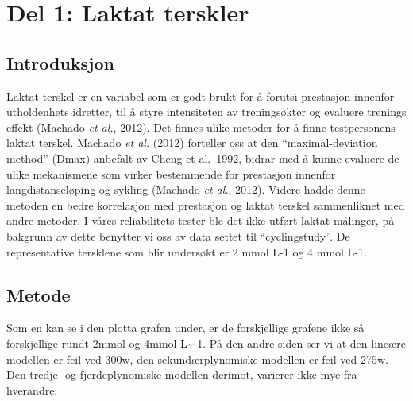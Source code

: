 \documentclass[
  letterpaper,
  DIV=11,
  numbers=noendperiod]{scrreprt}
\begin{document}
\section{Del 1: Laktat terskler}\label{del-1-laktat-terskler}

\subsection{Introduksjon}\label{introduksjon-1}

Laktat terskel er en variabel som er godt brukt for å forutsi prestasjon
innenfor utholdenhets idretter, til å styre intensiteten av
treningsøkter og evaluere trenings effekt (Machado \emph{et al.}, 2012).
Det finnes ulike metoder for å finne testpersonens laktat terskel.
Machado \emph{et al.} (2012) forteller oss at den ``maximal-deviation
method'' (Dmax) anbefalt av Cheng et al.~1992, bidrar med å kunne
evaluere de ulike mekanismene som virker bestemmende for prestasjon
innenfor langdistanseløping og sykling (Machado \emph{et al.}, 2012).
Videre hadde denne metoden en bedre korrelasjon med prestasjon og laktat
terskel sammenliknet med andre metoder. I våres reliabilitets tester ble
det ikke utført laktat målinger, på bakgrunn av dette benytter vi oss av
data settet til ``cyclingstudy''. De representative tersklene som blir
undersøkt er 2 mmol L-1 og 4 mmol L-1.

\subsection{Metode}\label{metode-1}

Som en kan se i den plotta grafen under, er de forskjellige grafene ikke
så forskjellige rundt 2mmol og 4mmol L\textasciitilde-1. På den andre
siden ser vi at den lineære modellen er feil ved 300w, den
sekundærplynomiske modellen er feil ved 275w. Den tredje- og
fjerdeplynomiske modellen derimot, varierer ikke mye fra hverandre.
\end{document}
